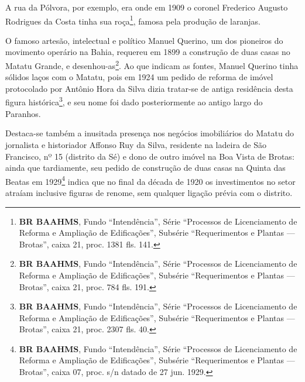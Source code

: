 A rua da Pólvora, por exemplo, era onde em 1909 o coronel Frederico Augusto Rodrigues da Costa tinha sua roça\footnote{\textbf{BR BAAHMS}, Fundo ``Intendência'', Série ``Processos de Licenciamento de Reforma e Ampliação de Edificações'', Subsérie ``Requerimentos e Plantas --- Brotas'', caixa 21, proc. 1381 fls. 141.}, famosa pela produção de laranjas. 














O famoso artesão, intelectual e político Manuel Querino, um dos pioneiros do movimento operário na Bahia, requereu em 1899 a construção de duas casas no Matatu Grande, e desenhou-as\footnote{\textbf{BR BAAHMS}, Fundo ``Intendência'', Série ``Processos de Licenciamento de Reforma e Ampliação de Edificações'', Subsérie ``Requerimentos e Plantas --- Brotas'', caixa 21, proc. 784 fls. 191.}. Ao que indicam as fontes, Manuel Querino tinha sólidos laços com o Matatu, pois em 1924 um pedido de reforma de imóvel protocolado por Antônio Hora da Silva dizia tratar-se de antiga residência desta figura histórica\footnote{\textbf{BR BAAHMS}, Fundo ``Intendência'', Série ``Processos de Licenciamento de Reforma e Ampliação de Edificações'', Subsérie ``Requerimentos e Plantas --- Brotas'', caixa 21, proc. 2307 fls. 40.}, e seu nome foi dado posteriormente ao antigo largo do Paranhos.

Destaca-se também a inusitada presença nos negócios imobiliários do Matatu do jornalista e historiador Affonso Ruy da Silva, residente na ladeira de São Francisco, nº 15 (distrito da Sé) e dono de outro imóvel na Boa Vista de Brotas: ainda que tardiamente, seu pedido de construção de duas casas na Quinta das Beatas em 1929\footnote{\textbf{BR BAAHMS}, Fundo ``Intendência'', Série ``Processos de Licenciamento de Reforma e Ampliação de Edificações'', Subsérie ``Requerimentos e Plantas --- Brotas'', caixa 07, proc.  s/n datado de 27 jun. 1929.} indica que no final da década de 1920 os investimentos no setor atraíam inclusive figuras de renome, sem qualquer ligação prévia com o distrito.

